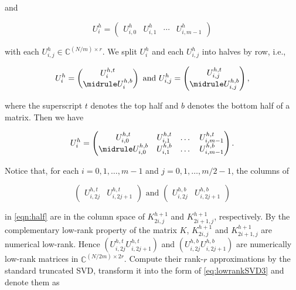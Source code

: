 and

\begin{equation*}
U_{i}^h=
\begin{pmatrix}
U^h_{i,0} & U^h_{i,1} & \cdots & U^h_{i,m-1}
\end{pmatrix}
\end{equation*}

with each $U^h_{i,j}\in \mathbb{C}^{(N/m)\times r}$.  We split $U^h_i$ and each $U^h_{i,j}$ into halves by row, i.e.,

\begin{equation*}
U^h_i=
\begin{pmatrix}
U^{h,t}_{i}\\
\midrule
U^{h,b}_{i}
\end{pmatrix}
\text{  and   } U^h_{i,j}=
\begin{pmatrix}
U^{h,t}_{i,j}\\
\midrule
U^{h,b}_{i,j}
\end{pmatrix},
\end{equation*}

where the superscript $t$ denotes the top half and $b$ denotes the bottom half of a matrix. Then we have

\begin{equation}
\label{eqn:half}
U^h_{i}=
\begin{pmatrix}
U^{h,t}_{i,0} &  U^{h,t}_{i,1} & \dots &U^{h,t}_{i,m-1}\\
\midrule
U^{h,b}_{i,0} & U^{h,b}_{i,1} &\dots &U^{h,b}_{i,m-1}
\end{pmatrix}.
\end{equation}

Notice that, for each $i=0,1,\dots, m-1$ and $j=0,1,\dots, m/2-1$, the columns of

\begin{equation}
  \begin{pmatrix}
    U^{h,t}_{i,2j} &  U^{h,t}_{i,2j+1}
  \end{pmatrix}
  \text{   and    }
  \begin{pmatrix}
    U^{h,b}_{i,2j} & U^{h,b}_{i,2j+1}
  \end{pmatrix}
  \label{eq:blocks}
\end{equation}

in \eqref{eqn:half} are in the column space of $K^{h+1}_{2i,j}$ and $K^{h+1}_{2i+1,j}$, respectively.  By the complementary low-rank property of the matrix $K$, $K^{h+1}_{2i,j}$ and $K^{h+1}_{2i+1,j}$ are numerical low-rank.  Hence $\left( U^{h,t}_{i,2j} U^{h,t}_{i,2j+1}
\right)$ and $\left( U^{h,b}_{i,2j} U^{h,b}_{i,2j+1} \right)$ are numerically low-rank matrices in $\mathbb{C}^{(N/2m)\times 2r}$. Compute their rank-$r$ approximations by the standard truncated {SVD}, transform it into the form of \eqref{eq:lowrankSVD3} and denote them as

